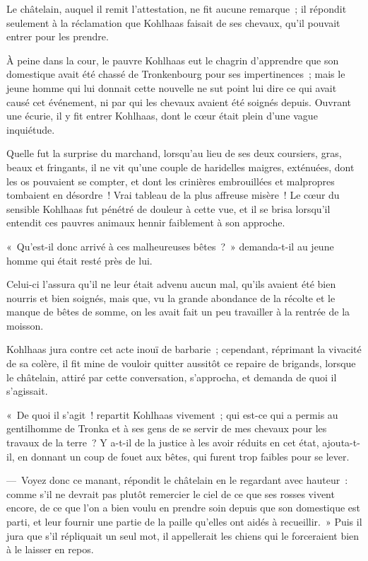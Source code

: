 \documentclass[french,twoside]{book} %
\begin{document}
Le châtelain, auquel il remit l’attestation, ne fit aucune remarque ; il répondit seulement à la réclamation que Kohlhaas faisait de ses chevaux, qu’il pouvait entrer pour les prendre.\par
À peine dans la cour, le pauvre Kohlhaas eut le chagrin d’apprendre que son domestique avait été chassé de Tronkenbourg pour ses impertinences ; mais le jeune homme qui lui donnait cette nouvelle ne sut point lui dire ce qui avait causé cet événement, ni par qui les chevaux avaient été soignés depuis. Ouvrant une écurie, il y fit entrer Kohlhaas, dont le cœur était plein d’une vague inquiétude.\par
Quelle fut la surprise du marchand, lorsqu’au lieu de ses deux coursiers, gras, beaux et fringants, il ne vit qu’une couple de haridelles maigres, exténuées, dont les os pouvaient se compter, et dont les crinières embrouillées et malpropres tombaient en désordre ! Vrai tableau de la plus affreuse misère ! Le cœur du sensible Kohlhaas fut pénétré de douleur à cette vue, et il se brisa lorsqu’il entendit ces pauvres animaux hennir faiblement à son approche.\par
« Qu’est-il donc arrivé à ces malheureuses bêtes ? » demanda-t-il au jeune homme qui était resté près de lui.\par
Celui-ci l’assura qu’il ne leur était advenu aucun mal, qu’ils avaient été bien nourris et bien soignés, mais que, vu la grande abondance de la récolte et le manque de bêtes de somme, on les avait fait un peu travailler à la rentrée de la moisson.\par
Kohlhaas jura contre cet acte inouï de barbarie ; cependant, réprimant la vivacité de sa colère, il fit mine de vouloir quitter aussitôt ce repaire de brigands, lorsque le châtelain, attiré par cette conversation, s’approcha, et demanda de quoi il s’agissait.\par
« De quoi il s’agit ! repartit Kohlhaas vivement ; qui est-ce qui a permis au gentilhomme de Tronka et à ses gens de se servir de mes chevaux pour les travaux de la terre ? Y a-t-il de la justice à les avoir réduits en cet état, ajouta-t-il, en donnant un coup de fouet aux bêtes, qui furent trop faibles pour se lever.\par
— Voyez donc ce manant, répondit le châtelain en le regardant avec hauteur : comme s’il ne devrait pas plutôt remercier le ciel de ce que ses rosses vivent encore, de ce que l’on a bien voulu en prendre soin depuis que son domestique est parti, et leur fournir une partie de la paille qu’elles ont aidés à recueillir. » Puis il jura que s’il répliquait un seul mot, il appellerait les chiens qui le forceraient bien à le laisser en repos.\par
\end{document}
